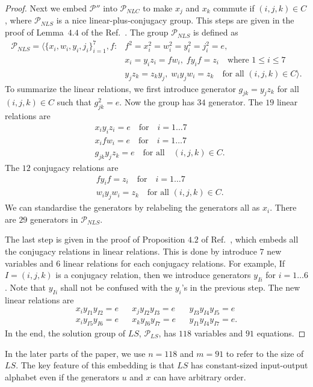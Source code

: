 \documentclass[11pt,letterpaper]{article}
\newcommand{\1}{\mathbb{1}}
\newcommand{\Pg}{\mathcal{P}}
\newcommand{\LS}{LS}
\theoremstyle{definition}
\begin{document}
\begin{proof}
Next we embed $\Pg''$ into $\Pg_{NLC}$ to make $x_j$ and $x_k$ commute if $(i,j,k) \in C$,
where $\Pg_{NLS}$ is a nice linear-plus-conjugacy group.
This steps are given in the proof of Lemma~$4.4$ of the Ref.~\cite{slofstra2017}.
The group $\Pg_{NLS}$ is defined as 
\begin{equation}
\begin{split}
\Pg_{NLS} = \langle \{x_i, w_i, y_i, j_i\}_{i=1}^{7},f : &f^2 = x_i^2 =w_i^2=y_i^2=j_i^2= e, \\
	&x_i = y_iz_i = fw_i,\; fy_if =z_i \quad\text{where } 1 \leq i \leq 7 \\
	&y_j z_k = z_ky_j,\; w_iy_jw_i = z_k \quad\text{for all } (i,j,k)\in C \rangle.
\end{split}
\end{equation}
To summarize the linear relations, we first introduce generator $g_{jk} = y_j z_k$ for all $(i,j,k) \in C$
such that $g_{jk}^2 = e$. Now the group has $34$ generator.
The $19$ linear relations are
\begin{align*}
	&x_i y_i z_i = e \quad \text{for} \quad i =1\dots 7 \\
	&x_i f w_i = e  \quad \text{for} \quad i =1\dots 7\\
	&g_{jk}y_jz_k =e \quad \text{for all}\quad (i,j,k) \in C.
\end{align*}
The $12$ conjugacy relations are 
\begin{align*}
	&fy_if = z_i\quad \text{for} \quad i =1\dots 7\\
	&w_iy_j w_i = z_k \quad\text{for all } (i,j,k)\in C.
\end{align*}
We can standardise the generators by relabeling the generators all as $x_i$.
There are $29$ generators in $\Pg_{NLS}$.

The last step is given in the proof of Proposition $4.2$ of Ref.~\cite{slofstra2017}, which
embeds all the conjugacy relations in linear relations.
This is done by introduce $7$ new variables and $6$ linear relations for each
conjugacy relations. For example, If $I = (i,j,k)$ is a conjugacy relation, then we introduce
generators $y_{Ii}$ for $i=1 \dots 6$. Note that $y_{Ii}$ shall not be confused with the $y_i$'s
in the previous step. The new linear relations are
\begin{align*}
	x_i y_{I1} y_{I2} = e && x_j y_{I2} y_{I3} = e && y_{I3}y_{I4}y_{I5} = e\\
	x_i y_{I5} y_{I6} = e && x_k y_{I6} y_{I7} = e && y_{I1}y_{I4}y_{I7} = e.
\end{align*}
In the end, the solution group of $\LS$, $\Pg_{\LS}$,  
has $118$ variables and $91$ equations.
\end{proof}
In the later parts of the paper, we use $n = 118$ and $m = 91$ to refer to the size of $\LS$.
The key feature of this embedding is that $\LS$ has constant-sized input-output alphabet
even if the generators $u$ and $x$ can have arbitrary order. 
\end{document}
